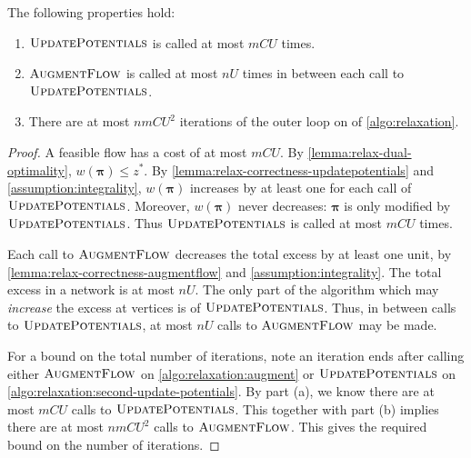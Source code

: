 \begin{lemma} \label{lemma:relax-iterations} 
The following properties hold:
\begin{enumerate}[label=(\alph*)]
    \item $\textproc{UpdatePotentials}$ is called at most $mCU$ times.
    \item $\textproc{AugmentFlow}$ is called at most $nU$ times in between each call to $\textproc{UpdatePotentials}$.
    \item There are at most $nmCU^2$ iterations of the outer loop on  of \cref{algo:relaxation}.
\end{enumerate}
\end{lemma}
\begin{proof}
A feasible flow has a cost of at most $mCU$. By \cref{lemma:relax-dual-optimality}, $w\left(\boldsymbol{\pi}\right) \leq z^*$. By \cref{lemma:relax-correctness-updatepotentials} and \cref{assumption:integrality}, $w\left(\boldsymbol{\pi}\right)$ increases by at least one for each call of $\textproc{UpdatePotentials}$. Moreover, $w\left(\boldsymbol{\pi}\right)$ never decreases: $\boldsymbol{\pi}$ is only modified by $\textproc{UpdatePotentials}$. Thus $\textproc{UpdatePotentials}$ is called at most $mCU$ times.

Each call to $\textproc{AugmentFlow}$ decreases the total excess by at least one unit, by \cref{lemma:relax-correctness-augmentflow} and \cref{assumption:integrality}. The total excess in a network is at most $nU$. The only part of the algorithm which may \emph{increase} the excess at vertices is  of $\textproc{UpdatePotentials}$. Thus, in between calls to $\textproc{UpdatePotentials}$, at most $nU$ calls to $\textproc{AugmentFlow}$ may be made.

For a bound on the total number of iterations, note an iteration ends after calling either $\textproc{AugmentFlow}$ on \cref{algo:relaxation:augment} or $\textproc{UpdatePotentials}$ on \cref{algo:relaxation:second-update-potentials}\footnotemark. By part (a), we know there are at most $mCU$ calls to $\textproc{UpdatePotentials}$. This together with part (b) implies there are at most $nmCU^2$ calls to $\textproc{AugmentFlow}$. This gives the required bound on the number of iterations.
\end{proof}

